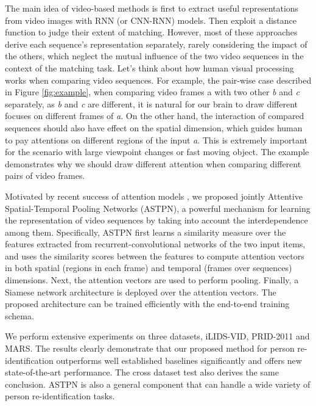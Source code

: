 \documentclass[10pt,twocolumn,letterpaper]{article}
\begin{document}
The main idea of video-based methods is first to extract useful representations from video images with RNN (or CNN-RNN) models. Then exploit a distance function to judge their extent of matching. However, most of these approaches derive each sequence's representation separately, rarely considering the impact of the others, which neglect the mutual influence of the two video sequences in the context of the matching task. Let's think about how human visual processing works when comparing video sequences. For example, the pair-wise case described in Figure \ref{fig:example}, when comparing video frames a with two other \textit{b} and \textit{c} separately, as \textit{b} and \textit{c} are different, it is natural for our brain to draw different focuses on different frames of \textit{a}. On the other hand, the interaction of compared sequences should also have effect on the spatial dimension, which guides human to pay attentions on different regions of the input \textit{a}. This is extremely important for the scenario with large viewpoint changes or fast moving object. The example demonstrates why we should draw different attention when comparing different pairs of video frames. 

Motivated by recent success of attention models \cite{DBLP:journals/corr/BahdanauCB14,DBLP:conf/icml/XuBKCCSZB15,DBLP:journals/tacl/YinSXZ16,Santos2016AttentivePN}, we proposed jointly Attentive Spatial-Temporal Pooling Networks (ASTPN), a powerful mechanism for learning the representation of video sequences by taking into account the interdependence among them. Specifically, ASTPN first learns a similarity measure over the features extracted from recurrent-convolutional networks of the two input items, and uses the similarity scores between the features to compute attention vectors in both spatial (regions in each frame) and temporal (frames over sequences) dimensions. Next, the attention vectors are used to perform pooling. Finally, a Siamese network architecture is deployed over the attention vectors. The proposed architecture can be trained efficiently with the end-to-end training schema.  

We perform extensive experiments on three datasets, iLIDS-VID, PRID-2011 and MARS. The results clearly demonstrate that our proposed method for person re-identification outperforms well established baselines significantly and offers new state-of-the-art performance. The cross dataset test also derives the same conclusion. ASTPN is also a general component that can handle a wide variety of person re-identification tasks.
\end{document}
